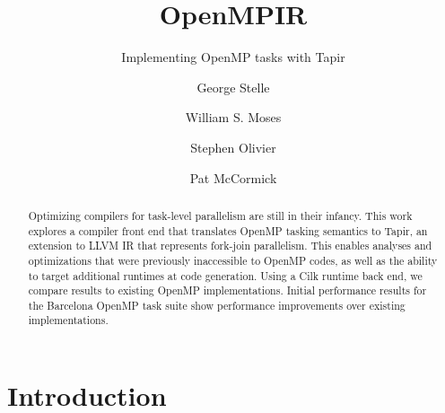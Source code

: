 \documentclass[sigconf]{acmart}
\begin{document}

\title{OpenMPIR}
\subtitle{Implementing OpenMP tasks with Tapir}

\author{George Stelle}

\author{William S. Moses}

\author{Stephen Olivier}

\author{Pat McCormick}

\begin{abstract}
Optimizing compilers for task-level parallelism are still in their infancy.
This work explores a compiler front end that translates OpenMP tasking
semantics to Tapir, an extension to LLVM IR that represents fork-join
parallelism. This enables analyses and optimizations that were previously
inaccessible to OpenMP codes, as well as the ability to target additional
runtimes at code generation. Using a Cilk runtime back end, we compare results
to existing OpenMP implementations.  Initial performance results for the
Barcelona OpenMP task suite show performance improvements over existing
implementations.
\end{abstract}

\maketitle

\section{Introduction} \label{Sec:Introduction}
 
\end{document}
